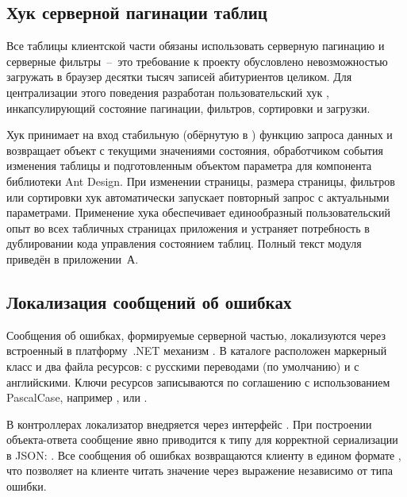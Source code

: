 \subsection{Хук серверной пагинации таблиц}

Все таблицы клиентской части обязаны использовать серверную пагинацию и серверные фильтры~--~это требование к проекту обусловлено невозможностью загружать в браузер десятки тысяч записей абитуриентов целиком.
Для централизации этого поведения разработан пользовательский хук , инкапсулирующий состояние пагинации, фильтров, сортировки и загрузки.

Хук принимает на вход стабильную (обёрнутую в ) функцию запроса данных и возвращает объект с текущими значениями состояния, обработчиком события изменения таблицы и подготовленным объектом параметра  для компонента  библиотеки Ant Design.
При изменении страницы, размера страницы, фильтров или сортировки хук автоматически запускает повторный запрос с актуальными параметрами.
Применение хука обеспечивает единообразный пользовательский опыт во всех табличных страницах приложения и устраняет потребность в дублировании кода управления состоянием таблиц.
Полный текст модуля  приведён в приложении~А.

\subsection{Локализация сообщений об ошибках}

Сообщения об ошибках, формируемые серверной частью, локализуются через встроенный в платформу~.NET механизм .
В каталоге  расположен маркерный класс  и два файла ресурсов:  с русскими переводами (по умолчанию) и  с английскими.
Ключи ресурсов записываются по соглашению  с использованием PascalCase, например ,  или .

В контроллерах локализатор внедряется через интерфейс .
При построении объекта-ответа сообщение явно приводится к типу  для корректной сериализации в JSON: .
Все сообщения об ошибках возвращаются клиенту в едином формате , что позволяет на клиенте читать значение через выражение  независимо от типа ошибки.

